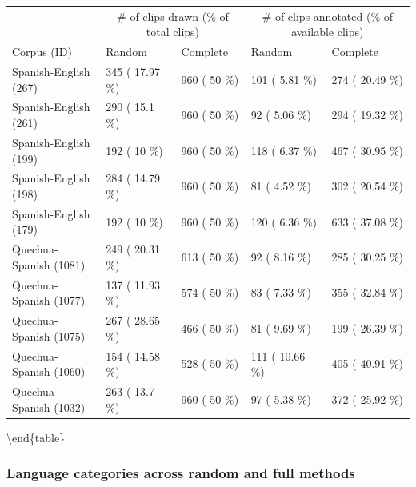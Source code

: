\documentclass[
]{article}
\begin{document}
\begin{tabular}[t]{lllll}
\toprule
\multicolumn{1}{c}{ } & \multicolumn{2}{c}{\# of clips drawn (\% of total clips)} & \multicolumn{2}{c}{\# of clips annotated (\% of available clips)} \\
\cmidrule(l{3pt}r{3pt}){2-3} \cmidrule(l{3pt}r{3pt}){4-5}
Corpus (ID) & Random & Complete & Random & Complete\\
\midrule
Spanish-English (267) & 345 ( 17.97 \%) & 960 ( 50 \%) & 101 ( 5.81 \%) & 274 ( 20.49 \%)\\
Spanish-English (261) & 290 ( 15.1 \%) & 960 ( 50 \%) & 92 ( 5.06 \%) & 294 ( 19.32 \%)\\
Spanish-English (199) & 192 ( 10 \%) & 960 ( 50 \%) & 118 ( 6.37 \%) & 467 ( 30.95 \%)\\
Spanish-English (198) & 284 ( 14.79 \%) & 960 ( 50 \%) & 81 ( 4.52 \%) & 302 ( 20.54 \%)\\
Spanish-English (179) & 192 ( 10 \%) & 960 ( 50 \%) & 120 ( 6.36 \%) & 633 ( 37.08 \%)\\
\addlinespace
Quechua-Spanish (1081) & 249 ( 20.31 \%) & 613 ( 50 \%) & 92 ( 8.16 \%) & 285 ( 30.25 \%)\\
Quechua-Spanish (1077) & 137 ( 11.93 \%) & 574 ( 50 \%) & 83 ( 7.33 \%) & 355 ( 32.84 \%)\\
Quechua-Spanish (1075) & 267 ( 28.65 \%) & 466 ( 50 \%) & 81 ( 9.69 \%) & 199 ( 26.39 \%)\\
Quechua-Spanish (1060) & 154 ( 14.58 \%) & 528 ( 50 \%) & 111 ( 10.66 \%) & 405 ( 40.91 \%)\\
Quechua-Spanish (1032) & 263 ( 13.7 \%) & 960 ( 50 \%) & 97 ( 5.38 \%) & 372 ( 25.92 \%)\\
\bottomrule
\end{tabular}

\textbackslash end\{table\}

\hypertarget{language-categories-across-random-and-full-methods}{%
\subsubsection{Language categories across random and full methods}\label{language-categories-across-random-and-full-methods}}
\end{document}

